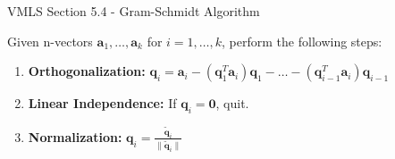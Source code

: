 \begin{notes}{VMLS Section 5.4 - Gram-Schmidt Algorithm}
    \begin{Highlight}
        Given n-vectors $\mathbf{a}_1, \ldots, \mathbf{a}_k$ for $i = 1, \ldots, k$, perform the following steps:

        \begin{enumerate}
            \item \textbf{Orthogonalization:} $\mathbf{q}_i = \mathbf{a}_i - (\mathbf{q}_1^T \mathbf{a}_i)\mathbf{q}_1 - \ldots - (\mathbf{q}_{i-1}^T \mathbf{a}_i)\mathbf{q}_{i-1}$
            \item \textbf{Linear Independence:} If $\mathbf{q}_i = \mathbf{0}$, quit.
            \item \textbf{Normalization:} $\mathbf{q}_i = \frac{\mathbf{\tilde{q}}_i}{\|\mathbf{\tilde{q}}_i\|}$
        \end{enumerate}

    \end{Highlight}
\end{notes}